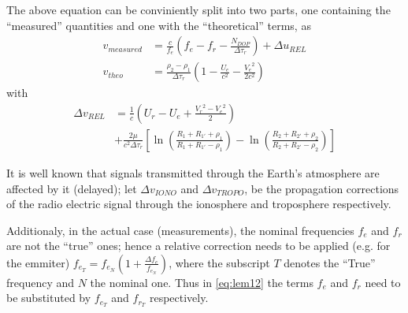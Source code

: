The above equation can be conviniently split into two parts, one containing the ``measured'' 
quantities and one with the ``theoretical'' terms, as 
\begin{subequations}\label{eq:lem12}
  \begin{align}
    v_{measured} & = \frac{c}{f_e} (f_e - f_r -
     \frac{N_{DOP}}{\Delta\tau_r}) + \Delta u_{REL} \label{eq:lem12a} \\
    v_{theo}     &= \frac{\rho_2 - \rho_1}{\Delta\tau_r} (1- \frac{U_e}{c^2} - 
      \frac{{V_e}^2}{2 c^2}) \label{eq:lem12b}
  \end{align}
\end{subequations}
with
\begin{equation}
    \begin{split}
        \Delta v_{REL} &= \frac{1}{c} (U_r - U_e + \frac{{V_r}^2 - {V_e}^2}{2}) \\
        & + \frac{2 \mu}{c^2 \Delta\tau_r} [\ln{(\frac{R_1 + R_{1'} + \rho_1}{R_1 + R_{1'} - \rho_1})} - \ln{(\frac{R_2 + R_{2'} + \rho_2}{R_2 + R_{2'} - \rho_2})}]
    \end{split}
\end{equation}

It is well known that signals transmitted through the Earth's atmosphere are affected by 
it (delayed); let $\Delta v_{IONO}$ and $\Delta v_{TROPO}$, be the propagation corrections of 
the radio electric signal through the ionosphere and troposphere respectively. 

Additionaly, in the actual case (measurements), the nominal frequencies $f_e$ and $f_r$ 
are not the ``true'' ones; hence a relative correction needs to be applied (e.g. for the 
emmiter) $f_{e_T} = f_{e_N} (1 + \frac{\Delta f_e}{f_{e_N}})$, where the subscript $T$ 
denotes the ``True'' frequency and $N$ the nominal one. Thus in \autoref{eq:lem12} the 
terms $f_e$ and $f_r$ need to be substituted by $f_{e_T}$ and $f_{r_T}$ respectively.

